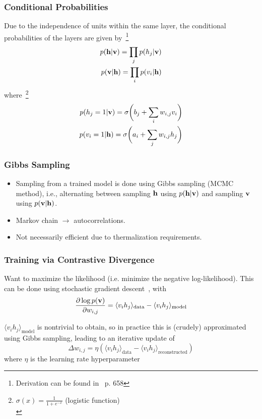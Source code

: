 \documentclass{beamer}
\begin{document}
\begin{frame}
    \frametitle{Conditional Probabilities}
    Due to the independence of units within the same layer, the conditional probabilities of the layers are given by~\footnote{Derivation can be found in~\cite{goodfellow_deep_learning} p. 658}
    \begin{align*}
        p(\mathbf{h} | \mathbf{v}) = \prod_j p(h_j | \mathbf{v}) \\
        p(\mathbf{v} | \mathbf{h}) = \prod_i p(v_i | \mathbf{h})
    \end{align*}
    where~\footnote{\( \sigma(x) = \frac{1}{1 + e^{-x}} \) (logistic function) \\}
    \begin{align*}
        p(h_j = 1 | \mathbf{v}) = \sigma\bigg( b_j + \sum_i w_{i,j} v_i \bigg) \\
        p(v_i = 1 | \mathbf{h}) = \sigma\bigg( a_i + \sum_j w_{i,j} h_j \bigg)
    \end{align*}
\end{frame}

\begin{frame}
    \frametitle{Gibbs Sampling}
    \begin{itemize}
        \item Sampling from a trained model is done using Gibbs sampling (MCMC method), i.e., alternating between sampling \( \mathbf{h} \) using \( p(\mathbf{h} | \mathbf{v}) \) and sampling \( \mathbf{v} \) using \( p(\mathbf{v} | \mathbf{h}) \).
        \item Markov chain \( \rightarrow \) autocorrelations.
        \item Not necessarily efficient due to thermalization requirements.
    \end{itemize}
\end{frame}

\begin{frame}
    \frametitle{Training via Contrastive Divergence}
    Want to maximize the likelihood (i.e. minimize the negative log-likelihood).
    This can be done using stochastic gradient descent~\cite{hinton_rbm_training}, with
    \[
        \frac{\partial \log p(\mathbf{v})}{\partial w_{i,j}} = \langle v_i h_j \rangle_{\text{data}} - \langle v_i h_j \rangle_{\text{model}}
    \]

    \( \langle v_i h_j \rangle_{\text{model}} \) is nontrivial to obtain, so in practice this is (crudely) approximated using Gibbs sampling, leading to an iterative update of
    \[
        \Delta w_{i,j} = \eta (\langle v_i h_j \rangle_{\text{data}} - \langle v_i h_j \rangle_{\text{reconstructed}})
    \]
    where \( \eta \) is the learning rate hyperparameter
\end{frame}
\end{document}
